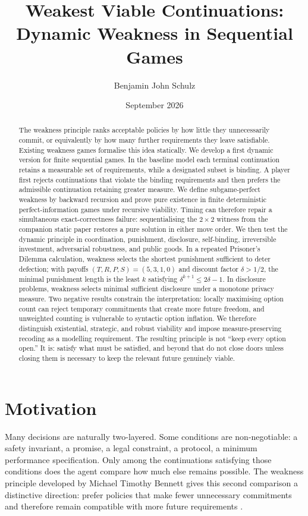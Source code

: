 \documentclass[11pt]{article}
\title{Weakest Viable Continuations:\\Dynamic Weakness in Sequential Games}
\author{Benjamin John Schulz}
\date{September 2026}
\theoremstyle{definition}
\begin{document}
\maketitle

\begin{abstract}
The weakness principle ranks acceptable policies by how little they unnecessarily commit, or equivalently by how many further requirements they leave satisfiable. Existing weakness games formalise this idea statically. We develop a first dynamic version for finite sequential games. In the baseline model each terminal continuation retains a measurable set of requirements, while a designated subset is binding. A player first rejects continuations that violate the binding requirements and then prefers the admissible continuation retaining greater measure. We define subgame-perfect weakness by backward recursion and prove pure existence in finite deterministic perfect-information games under recursive viability. Timing can therefore repair a simultaneous exact-correctness failure: sequentialising the $2\times2$ witness from the companion static paper restores a pure solution in either move order. We then test the dynamic principle in coordination, punishment, disclosure, self-binding, irreversible investment, adversarial robustness, and public goods. In a repeated Prisoner's Dilemma calculation, weakness selects the shortest punishment sufficient to deter defection; with payoffs $(T,R,P,S)=(5,3,1,0)$ and discount factor $\delta>1/2$, the minimal punishment length is the least $k$ satisfying $\delta^{k+1}\le 2\delta-1$. In disclosure problems, weakness selects minimal sufficient disclosure under a monotone privacy measure. Two negative results constrain the interpretation: locally maximising option count can reject temporary commitments that create more future freedom, and unweighted counting is vulnerable to syntactic option inflation. We therefore distinguish existential, strategic, and robust viability and impose measure-preserving recoding as a modelling requirement. The resulting principle is not ``keep every option open.'' It is: satisfy what must be satisfied, and beyond that do not close doors unless closing them is necessary to keep the relevant future genuinely viable.
\end{abstract}

\section{Motivation}

Many decisions are naturally two-layered. Some conditions are non-negotiable: a safety invariant, a promise, a legal constraint, a protocol, a minimum performance specification. Only among the continuations satisfying those conditions does the agent compare how much else remains possible. The weakness principle developed by Michael Timothy Bennett gives this second comparison a distinctive direction: prefer policies that make fewer unnecessary commitments and therefore remain compatible with more future requirements \cite{bennett2023,bennett2025}.
\end{document}
